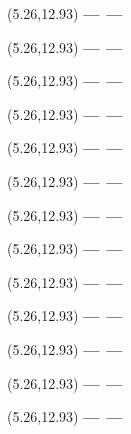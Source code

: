 \documentclass[12pt,a4paper]{article}
\begin{document}
\begin{textblock}{3}(5.26,12.93)
{\bf ---}\quad\quad\ {\bf ---}
\end{textblock}
\newpage

\begin{textblock}{3}(5.26,12.93)
{\bf ---}\quad\quad\ {\bf ---}
\end{textblock}
\newpage

\begin{textblock}{3}(5.26,12.93)
{\bf ---}\quad\quad\ {\bf ---}
\end{textblock}
\newpage

\begin{textblock}{3}(5.26,12.93)
{\bf ---}\quad\quad\ {\bf ---}
\end{textblock}
\newpage

\begin{textblock}{3}(5.26,12.93)
{\bf ---}\quad\quad\ {\bf ---}
\end{textblock}
\newpage

\begin{textblock}{3}(5.26,12.93)
{\bf ---}\quad\quad\ {\bf ---}
\end{textblock}
\newpage

\begin{textblock}{3}(5.26,12.93)
{\bf ---}\quad\quad\ {\bf ---}
\end{textblock}
\newpage

\begin{textblock}{3}(5.26,12.93)
{\bf ---}\quad\quad\ {\bf ---}
\end{textblock}
\newpage

\begin{textblock}{3}(5.26,12.93)
{\bf ---}\quad\quad\ {\bf ---}
\end{textblock}
\newpage

\begin{textblock}{3}(5.26,12.93)
{\bf ---}\quad\quad\ {\bf ---}
\end{textblock}
\newpage

\begin{textblock}{3}(5.26,12.93)
{\bf ---}\quad\quad\ {\bf ---}
\end{textblock}
\newpage

\begin{textblock}{3}(5.26,12.93)
{\bf ---}\quad\quad\ {\bf ---}
\end{textblock}
\newpage

\begin{textblock}{3}(5.26,12.93)
{\bf ---}\quad\quad\ {\bf ---}
\end{textblock}
\newpage
\end{document}

